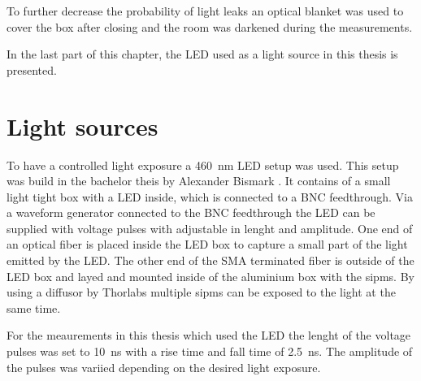 To further decrease the probability of light leaks an optical blanket was used to cover the box after closing and the room was darkened during the measurements.

In the last part of this chapter, the LED used as a light source in this thesis is presented.

\section{Light sources}
To have a controlled light exposure a \SI{460}{\nano\meter} LED setup was used.
This setup was build in the bachelor theis by Alexander Bismark \cite{alex_bismark}.
It contains of a small light tight box with a LED inside, which is connected to a BNC feedthrough.
Via a waveform generator connected to the BNC feedthrough the LED can be supplied with voltage pulses with adjustable in lenght and amplitude. 
One end of an optical fiber is placed inside the LED box to capture a small part of the light emitted by the LED.
The other end of the SMA terminated fiber is outside of the LED box and layed and mounted inside of the aluminium box with the \ac{sipm}s.
By using a diffusor by Thorlabs \cite{thorlabs_diffusor} multiple \ac{sipm}s can be exposed to the light at the same time. 

For the meaurements in this thesis which used the LED the lenght of the voltage pulses was set to \SI{10}{\nano\second} with a rise time and fall time of \SI{2.5}{\nano\second}.
The amplitude of the pulses was variied depending on the desired light exposure.
